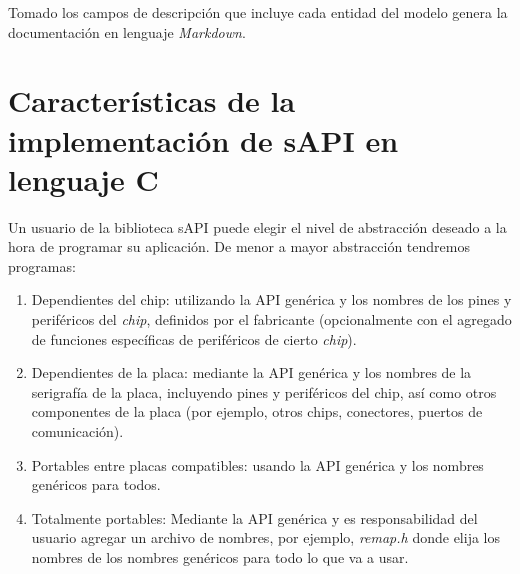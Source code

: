 Tomado los campos de descripción que incluye cada entidad del modelo genera la documentación en lenguaje \emph{Markdown}. 

\section{Características de la implementación de sAPI en lenguaje C}
\label{sec:codeImplemC}

Un usuario de la biblioteca sAPI puede elegir el nivel de abstracción deseado a la hora de programar su aplicación. De menor a mayor abstracción tendremos programas:

\begin{enumerate}
\item
Dependientes del chip: utilizando la API genérica y los nombres de los pines y periféricos del \emph{chip}, definidos por el fabricante (opcionalmente con el agregado de funciones específicas de periféricos de cierto \emph{chip}).
\item
Dependientes de la placa: mediante la API genérica y los nombres de la serigrafía de la placa, incluyendo pines y periféricos del chip, así como otros componentes de la placa (por ejemplo, otros chips, conectores, puertos de comunicación).
\item
Portables entre placas compatibles: usando la API genérica y los nombres genéricos para todos.
\item
Totalmente portables: Mediante la API genérica y es responsabilidad del usuario agregar un archivo de nombres, por ejemplo, \emph{remap.h} donde elija los nombres de los nombres genéricos para todo lo que va a usar.
\end{enumerate}
